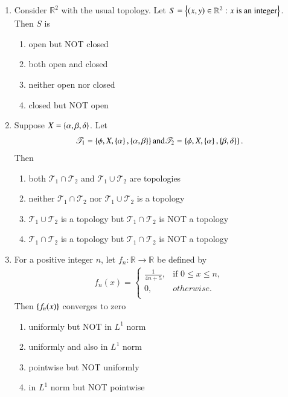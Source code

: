 \documentclass[journal]{IEEEtran}
\begin{document}
\begin{enumerate}
\item Consider $\mathbb R^2$ with the usual topology. Let $S=\left\{\left(x,y\right) \in \mathbb R^2:  x \text{ is an integer}\right\}$. Then $S$ is
\begin{enumerate}
    \item open but NOT closed
    \item both open and closed
    \item neither open nor closed
    \item closed but NOT open
\end{enumerate}

\item Suppose  $X = \left\{\alpha, \beta, \delta\right\}$. Let 
\begin{align*}
\mathscr{T}_1 = \left\{\phi, X, \left\{\alpha\right\}, \left\{\alpha, \beta\right\}\right\} \text{and} \mathscr{T}_2 = \left\{\phi, X, \left\{\alpha\right\}, \left\{\beta, \delta\right\}\right\}.
\end{align*}
Then 
\begin{enumerate}
    \item both $\mathscr{T}_1 \cap \mathscr{T}_2$ and $\mathscr{T}_1 \cup \mathscr{T}_2$ are topologies
    \item neither $\mathscr{T}_1 \cap \mathscr{T}_2$ nor $\mathscr{T}_1 \cup \mathscr{T}_2$ is a topology
    \item $\mathscr{T}_1 \cup \mathscr{T}_2$ is a topology but $\mathscr{T}_1 \cap \mathscr{T}_2$ is NOT a topology
    \item $\mathscr{T}_1 \cap \mathscr{T}_2$ is a topology but $\mathscr{T}_1 \cap \mathscr{T}_2$ is NOT a topology
\end{enumerate}

\item For a positive integer $n$, let $f_n:\mathbb R \rightarrow \mathbb R$ be defined by 
\begin{align*}
f_n(x)= \begin{cases} 
\frac{1}{4n+5}, & \text{if } 0 \leq x \leq n,\\
0, & otherwise. \\
\end{cases}
\end{align*}
Then $\left\{f_n(x)\right\}$ converges to zero
\begin{enumerate}
    \item uniformly but NOT in $L^1$ norm
    \item uniformly and also in $L^1$ norm
    \item pointwise but NOT uniformly
    \item in $L^1$ norm but NOT pointwise
\end{enumerate}


\end{enumerate}
\end{document}
